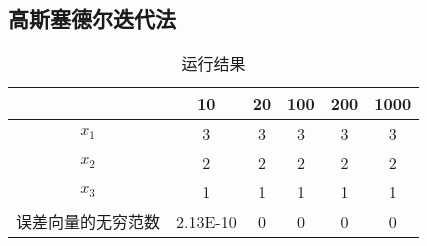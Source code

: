 \subsection{高斯塞德尔迭代法}

\qa 
\begin{table}[H]
	\centering
	\caption{运行结果}
	\begin{tabular}{c|ccccc}
		& 10    & 20    & 100   & 200   & 1000 \\
		\hline
		$x_1$    & 3     & 3     & 3     & 3     & 3 \\
		$x_2$    & 2     & 2     & 2     & 2     & 2 \\
		$x_3$    & 1     & 1     & 1     & 1     & 1 \\
		误差向量的无穷范数 & 2.13E-10 & 0     & 0     & 0     & 0 \\
	\end{tabular}%
	\label{tab:addlabel15-2}%
\end{table}%

